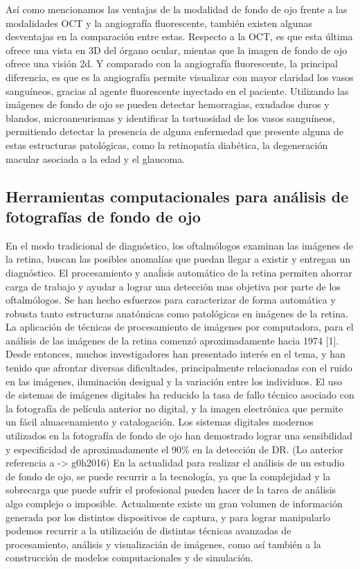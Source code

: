 As\'i como mencionamos las ventajas de la modalidad de fondo de ojo frente a las modalidades OCT y la angiograf\'ia fluorescente, tambi\'en existen algunas desventajas en la comparaci\'on entre estas. Respecto a la OCT, es que esta \'ultima ofrece una vista en 3D del \'organo ocular, mientas que la imagen de fondo de ojo ofrece una visi\'on 2d. Y comparado con la angiograf\'ia fluorescente, la principal diferencia, es que es la angiograf\'ia permite visualizar con mayor claridad los vasos sangu\'ineos, gracias al agente fluorescente inyectado en el paciente.
Utilizando las im\'agenes de fondo de ojo se pueden detectar hemorragias, exudados duros y blandos, microaneurismas y identificar la tortuosidad de los vasos sangu\'ineos, permitiendo detectar la presencia de alguna enfermedad que presente alguna de estas estructuras patol\'ogicas, como la retinopat\'ia diab\'etica, la degeneraci\'on macular asociada a la edad y el glaucoma.

\subsection{Herramientas computacionales para an\'alisis de fotograf\'ias de fondo de ojo}

En el modo tradicional de diagn\'ostico, los oftalm\'ologos examinan las im\'agenes de la retina, buscan las posibles anomal\'ias que puedan llegar a existir y entregan un diagn\'ostico. El procesamiento y ana\'lisis autom\'atico de la retina permiten ahorrar carga de trabajo y ayudar a lograr una detecci\'on mas objetiva por parte de los oftalm\'ologos. Se han hecho esfuerzos para caracterizar de forma autom\'atica y robusta tanto estructuras anatómicas como patológicas en im\'agenes de la retina. La aplicaci\'on de t\'ecnicas de procesamiento de im\'agenes por computadora, para el an\'alisis de las im\'agenes de la retina comenz\'o aproximadamente hacia 1974 [1]. Desde entonces, muchos investigadores han presentado inter\'es en el tema, y han tenido que afrontar diversas dificultades, principalmente relacionadas con el ruido en las im\'agenes, iluminaci\'on desigual y la variaci\'on entre los individuos. \cite{li2004automated}
El uso de sistemas de im\'agenes digitales ha reducido la tasa de fallo t\'ecnico asociado con la fotograf\'ia de pel\'icula anterior no digital, y la imagen electr\'onica que permite un f\'acil almacenamiento y catalogaci\'on. Los sistemas digitales modernos utilizados en la fotograf\'ia de fondo de ojo han demostrado lograr una sensibilidad y especificidad de aproximadamente el 90\% en la detecci\'on de DR. (Lo anterior referencia a -> g0h2016)
En la actualidad para realizar el an\'alisis de un  estudio de fondo de ojo, se puede recurrir a la tecnolog\'ia, ya que la complejidad y la sobrecarga que puede sufrir el profesional pueden hacer de la tarea de an\'alisis algo complejo o imposible. Actualmente existe un gran volumen de informaci\'on generada por los distintos dispositivos de captura, y para lograr manipularlo podemos recurrir a la utilizaci\'on de distintas t\'ecnicas avanzadas de procesamiento, an\'alisis y visualizaci\'an de im\'agenes, como as\'i tambi\'en a la construcci\'on de modelos computacionales y de simulaci\'on.

